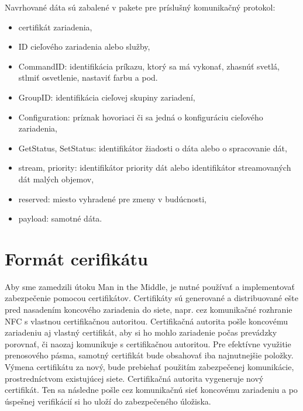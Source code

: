\documentclass[12pt,a4paper,oneside,openright]{report}
\begin{document}
Navrhované dáta sú zabalené v pakete pre príslušný komunikačný protokol:
\singlespacing
\begin{itemize}
	\item certifikát zariadenia,
	\item ID cieľového zariadenia alebo služby,
	\item CommandID: identifikácia príkazu, ktorý sa má vykonať, zhasnúť svetlá, stlmiť osvetlenie, nastaviť farbu a pod.
	\item GroupID: identifikácia cieľovej skupiny zariadení,
	\item Configuration: príznak hovoriaci či sa jedná o konfiguráciu cieľového zariadenia,
	\item GetStatus, SetStatus: identifikátor žiadosti o dáta alebo o spracovanie dát,
	\item stream, priority: identifikátor priority dát alebo identifikátor streamovaných dát malých objemov,
	\item reserved: miesto vyhradené pre zmeny v budúcnosti,
	\item payload: samotné dáta.
\end{itemize}
\onehalfspacing


\section{Formát cerifikátu}
Aby sme zamedzili útoku Man in the Middle, je nutné používať a implementovať zabezpečenie pomocou  certifikátov. Certifikáty sú generované a distribuované ešte pred nasadením koncového zariadenia do siete, napr. cez komunikačné rozhranie NFC s vlastnou certifikačnou autoritou. Certifikačná autorita pošle koncovému zariadeniu aj vlastný certifikát, aby si ho mohlo zariadenie počas prevádzky porovnať, či naozaj komunikuje s certifikačnou autoritou.
 Pre efektívne využitie prenosového pásma, samotný certifikát bude obsahovať iba najnutnejšie položky. Výmena certifikátu za nový, bude prebiehať použitím zabezpečenej komunikácie, prostredníctvom existujúcej siete. Certifikačná autorita vygeneruje nový certifikát. Ten sa následne pošle cez komunikačnú sieť koncovému zariadeniu a po úspešnej verifikácií si ho uloží do zabezpečeného úložiska.
\end{document}
